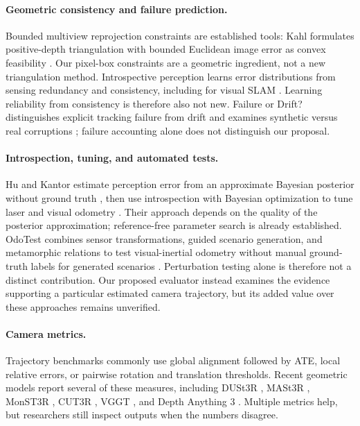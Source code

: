 \documentclass[10pt,twocolumn]{article}
\begin{document}
\paragraph{Geometric consistency and failure prediction.} Bounded multiview reprojection constraints are established tools: Kahl formulates positive-depth triangulation with bounded Euclidean image error as convex feasibility \cite{kahl2005linfinity}. Our pixel-box constraints are a geometric ingredient, not a new triangulation method. Introspective perception learns error distributions from sensing redundancy and consistency, including for visual SLAM \cite{rabiee2023introspective}. Learning reliability from consistency is therefore also not new. Failure or Drift? distinguishes explicit tracking failure from drift and examines synthetic versus real corruptions \cite{thomas2026failureordrift}; failure accounting alone does not distinguish our proposal.

\paragraph{Introspection, tuning, and automated tests.} Hu and Kantor estimate perception error from an approximate Bayesian posterior without ground truth \cite{hu2017introspection}, then use introspection with Bayesian optimization to tune laser and visual odometry \cite{hu2017tuning}. Their approach depends on the quality of the posterior approximation; reference-free parameter search is already established. OdoTest combines sensor transformations, guided scenario generation, and metamorphic relations to test visual-inertial odometry without manual ground-truth labels for generated scenarios \cite{zhou2026odotest}. Perturbation testing alone is therefore not a distinct contribution. Our proposed evaluator instead examines the evidence supporting a particular estimated camera trajectory, but its added value over these approaches remains unverified.

\paragraph{Camera metrics.} Trajectory benchmarks commonly use global alignment followed by ATE, local relative errors, or pairwise rotation and translation thresholds. Recent geometric models report several of these measures, including DUSt3R \cite{wang2023dustr}, MASt3R \cite{leroy2024mastr}, MonST3R \cite{zhang2024monstr}, CUT3R \cite{wang2025cut3r}, VGGT \cite{wang2025vggt}, and Depth Anything 3 \cite{yang2025depthanything3}. Multiple metrics help, but researchers still inspect outputs when the numbers disagree.
\end{document}
